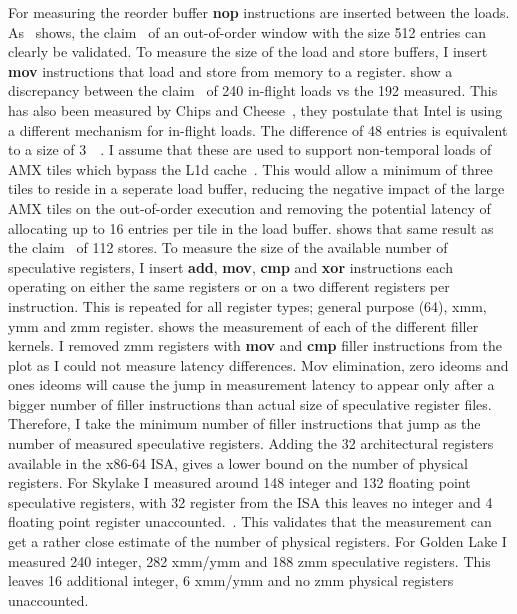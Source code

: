 For measuring the reorder buffer \textbf{nop} instructions are inserted between the loads.
As~ shows, the claim~\cite{ServerTheHome_2023_SPR_Press,Wccftech_2023_SPR_Press} of an out-of-order window with the size \SI{512}{} entries can clearly be validated.
To measure the size of the load and store buffers, I insert \textbf{mov} instructions that load and store from memory to a register.
 show a discrepancy between the claim~\cite{ServerTheHome_2023_SPR_Press,Wccftech_2023_SPR_Press} of 240 in-flight loads vs the 192 measured.
This has also been measured by Chips and Cheese~\cite{Chipsandcheese_2023_GoldenCove_Vector_Register}, they postulate that Intel is using a different mechanism for in-flight loads.
The difference of 48 entries is equivalent to a size of \SI{3}{\kibi\byte}.
I assume that these are used to support non-temporal loads of AMX tiles which bypass the L1d cache~\cite[Sec. 20.8]{Intel_Optimization_Reference_Manual_050}.
This would allow a minimum of three tiles to reside in a seperate load buffer, reducing the negative impact of the large AMX tiles on the out-of-order execution and removing the potential latency of allocating up to 16 entries per tile in the load buffer.
 shows that same result as the claim~\cite{ServerTheHome_2023_SPR_Press,Wccftech_2023_SPR_Press} of 112 stores.
To measure the size of the available number of speculative registers, I insert \textbf{add}, \textbf{mov}, \textbf{cmp} and \textbf{xor} instructions each operating on either the same registers or on a two different registers per instruction.
This is repeated for all register types; general purpose (\SI{64}{\bit}), xmm, ymm and zmm register.
 shows the measurement of each of the different filler kernels.
I removed zmm registers with \textbf{mov} and \textbf{cmp} filler instructions from the plot as I could not measure latency differences.
Mov elimination, zero ideoms and ones ideoms will cause the jump in measurement latency to appear only after a bigger number of filler instructions than actual size of speculative register files.
Therefore, I take the minimum number of filler instructions that jump as the number of measured speculative registers.
Adding the 32 architectural registers available in the x86-64 ISA, gives a lower bound on the number of physical registers.
For Skylake I measured around 148 integer and 132 floating point speculative registers, with 32 register from the ISA this leaves no integer and 4 floating point register unaccounted.~\cite{Intel_2017_Skylake_SP}.
This validates that the measurement can get a rather close estimate of the number of physical registers.
For Golden Lake I measured 240 integer, 282 xmm/ymm and 188 zmm speculative registers.
This leaves 16 additional integer, 6 xmm/ymm and no zmm physical registers unaccounted.~\cite{ServerTheHome_2023_SPR_Press,Wccftech_2023_SPR_Press}

